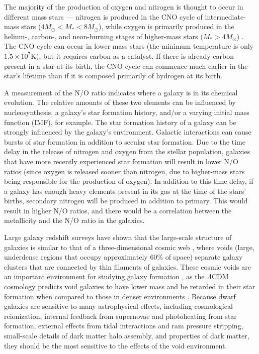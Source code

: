 The majority of the production of oxygen and nitrogen is thought to occur in 
different mass stars --- nitrogen is produced in the CNO cycle of 
intermediate-mass stars ($4M_{\odot} < M_* < 8M_{\odot}$), while oxygen is 
primarily produced in the helium-, carbon-, and neon-burning stages of 
higher-mass stars ($M_* > 4M_{\odot}$) \citep{Henry00,Henry06}.  The CNO cycle 
can occur in lower-mass stars (the minimum temperature is only 
$1.5\times 10^7$K), but it requires carbon as a catalyst.  If there is already 
carbon present in a star at its birth, the CNO cycle can commence much earlier 
in the star's lifetime than if it is composed primarily of hydrogen at its 
birth.

A measurement of the N/O ratio indicates where a galaxy is in its chemical 
evolution.  The relative amounts of these two elements can be influenced by 
nucleosynthesis, a galaxy's star formation history, and/or a varying initial 
mass function (IMF), for example.  The star formation history of a galaxy can be 
strongly influenced by the galaxy's environment.  Galactic interactions can 
cause bursts of star formation in addition to secular star formation.  Due to 
the time delay in the release of nitrogen and oxygen from the stellar 
population, galaxies that have more recently experienced star formation will 
result in lower N/O ratios (since oxygen is released sooner than nitrogen, due 
to higher-mass stars being responsible for the production of oxygen).  In 
addition to this time delay, if a galaxy has enough heavy elements present in 
its gas at the time of the stars' births, secondary nitrogen will be produced in 
addition to primary.  This would result in higher N/O ratios, and there would be 
a correlation between the metallicity and the N/O ratio in the galaxies.

Large galaxy redshift surveys have shown that the large-scale structure of 
galaxies is similar to that of a three-dimensional cosmic web \citep{Bond96}, 
where voids (large, underdense regions that occupy approximately 60\% of space) 
separate galaxy clusters that are connected by thin filaments of galaxies.  
These cosmic voids are an important environment for studying galaxy formation 
\citep[see][for a review]{vandeWeygaert11}, as the $\Lambda$CDM cosmology 
predicts void galaxies to have lower mass and be retarded in their star 
formation when compared to those in denser environments 
\citep[e.g.,][]{Gottlober03, Goldberg05, Cen11}.  Because dwarf galaxies are 
sensitive to many astrophysical effects, including cosmological reionization, 
internal feedback from supernovae and photoheating from star formation, external 
effects from tidal interactions and ram pressure stripping, small-scale details 
of dark matter halo assembly, and properties of dark matter, they should be the 
most sensitive to the effects of the void environment.  

